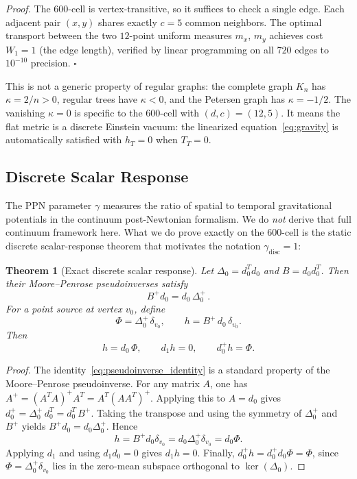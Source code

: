 \documentclass[12pt,a4paper]{article}
\newtheorem{theorem}{Theorem}
\theoremstyle{definition}
\begin{document}
\noindent\textit{Proof.}  The 600-cell is vertex-transitive, so it suffices to check a single edge.  Each adjacent pair $(x,y)$ shares exactly $c = 5$ common neighbors.  The optimal transport between the two $12$-point uniform measures $m_x$, $m_y$ achieves cost $W_1 = 1$ (the edge length), verified by linear programming on all $720$ edges to $10^{-10}$ precision.  \hfill$\square$

This is not a generic property of regular graphs: the complete graph $K_n$ has $\kappa = 2/n > 0$, regular trees have $\kappa < 0$, and the Petersen graph has $\kappa = -1/2$.  The vanishing $\kappa = 0$ is specific to the 600-cell with $(d,c) = (12, 5)$.  It means the flat metric is a discrete Einstein vacuum: the linearized equation~\eqref{eq:gravity} is automatically satisfied with $h_T = 0$ when $T_T = 0$.

\subsection{Discrete Scalar Response}

The PPN parameter $\gamma$ measures the ratio of spatial to temporal
gravitational potentials in the continuum post-Newtonian formalism.  We do
\emph{not} derive that full continuum framework here.  What we do prove exactly
on the 600-cell is the static discrete scalar-response theorem that motivates
the notation $\gamma_{\mathrm{disc}} = 1$:

\begin{theorem}[Exact discrete scalar response]
\label{thm:discrete_scalar_response}
Let $\Delta_0 = d_0^T d_0$ and $B = d_0 d_0^T$.  Then their Moore--Penrose
pseudoinverses satisfy
\begin{equation}
\boxed{B^+ d_0 = d_0\,\Delta_0^+}\,.
\label{eq:pseudoinverse_identity}
\end{equation}
For a point source at vertex $v_0$, define
\begin{equation}
\Phi = \Delta_0^+\,\delta_{v_0},
\qquad
h = B^+\,d_0\,\delta_{v_0}.
\end{equation}
Then
\begin{equation}
h = d_0\,\Phi,
\qquad
d_1 h = 0,
\qquad
d_0^+ h = \Phi.
\label{eq:discrete_scalar_response}
\end{equation}
\end{theorem}

\begin{proof}
The identity~\eqref{eq:pseudoinverse_identity} is a standard property of the
Moore--Penrose pseudoinverse.  For any matrix $A$, one has
$A^+ = (A^T\!A)^+ A^T = A^T (AA^T)^+$.  Applying this to $A = d_0$ gives
$d_0^+ = \Delta_0^+\,d_0^T = d_0^T\,B^+$.  Taking the transpose and using the
symmetry of $\Delta_0^+$ and $B^+$ yields
$B^+ d_0 = d_0 \Delta_0^+$.
Hence
\begin{equation}
h = B^+ d_0 \delta_{v_0} = d_0 \Delta_0^+ \delta_{v_0} = d_0 \Phi.
\end{equation}
Applying $d_1$ and using $d_1 d_0 = 0$ gives $d_1 h = 0$.  Finally,
$d_0^+ h = d_0^+ d_0 \Phi = \Phi$, since $\Phi = \Delta_0^+ \delta_{v_0}$
lies in the zero-mean subspace orthogonal to $\ker(\Delta_0)$.
\end{proof}
\end{document}
